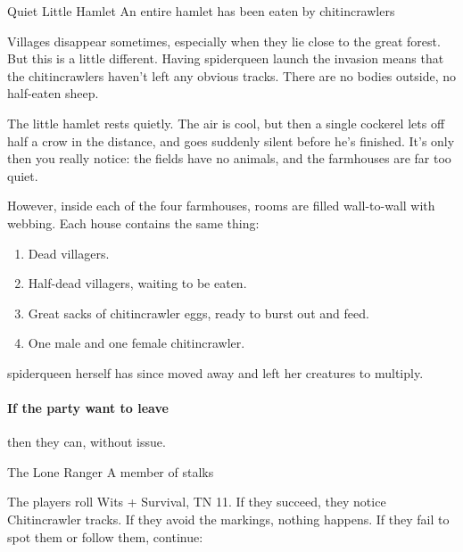 \begin{multicols}{2}
{Quiet Little Hamlet}%
{An entire hamlet has been eaten by chitincrawlers}%


Villages disappear sometimes, especially when they lie close to the great forest.  But this is a little different.  Having \gls{spiderqueen} launch the invasion means that the chitincrawlers haven't left any obvious tracks.  There are no bodies outside, no half-eaten sheep.

\begin{boxtext}

	The little hamlet rests quietly.
	The air is cool, but then a single cockerel lets off half a crow in the distance, and goes suddenly silent before he's finished.
	It's only then you really notice: the fields have no animals, and the farmhouses are far too quiet.

\end{boxtext}

However, inside each of the four farmhouses, rooms are filled wall-to-wall with webbing.  Each house contains the same thing:

\begin{enumerate}

	\item{Dead villagers.}
	\item{Half-dead villagers, waiting to be eaten.}
	\item{Great sacks of chitincrawler eggs, ready to burst out and feed.}
	\item{One male and one female chitincrawler.}
\end{enumerate}

\Gls{spiderqueen} herself has since moved away and left her creatures to multiply.

\paragraph{If the party want to leave}
then they can, without issue.



{The Lone Ranger}%
{A member of  stalks }%

The players roll Wits + Survival, TN 11.  If they succeed, they notice Chitincrawler tracks.  If they avoid the markings, nothing happens.  If they fail to spot them or follow them, continue:


\end{multicols}
